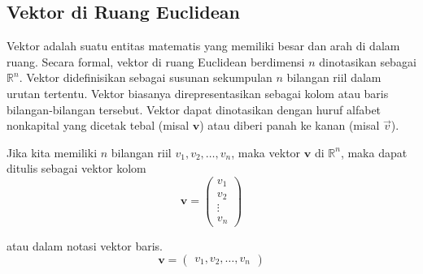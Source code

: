 \subsection{Vektor di Ruang Euclidean}
Vektor adalah suatu entitas matematis yang memiliki besar dan arah di dalam ruang. Secara formal, vektor di ruang Euclidean berdimensi $n$ dinotasikan sebagai $\mathbb{R}^n$. Vektor didefinisikan sebagai susunan sekumpulan $n$ bilangan riil dalam urutan tertentu. Vektor biasanya direpresentasikan sebagai kolom atau baris bilangan-bilangan tersebut. Vektor dapat dinotasikan dengan huruf alfabet nonkapital yang dicetak tebal (misal $\textbf{v}$) atau diberi panah ke kanan (misal $\vec{v}$).

Jika kita memiliki $n$ bilangan riil $v_1, v_2, \dots, v_n$, maka vektor $\mathbf{v}$ di $\mathbb{R}^n$, maka dapat ditulis sebagai vektor kolom
$$
\mathbf{v} = \begin{pmatrix}
    v_1 \\
    v_2 \\
    \vdots \\
    v_n
\end{pmatrix}
$$

atau dalam notasi vektor baris.
$$
\mathbf{v} = \begin{pmatrix}
    v_1, v_2, \dots, v_n
\end{pmatrix}
$$

